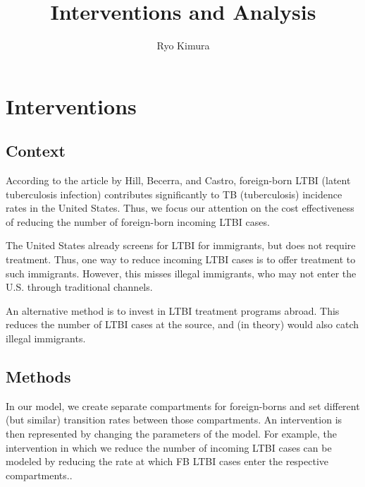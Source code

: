 \documentclass{article}[11pt]
\begin{document}
\title{Interventions and Analysis}
\author{Ryo Kimura}
\date{}
\maketitle

\section{Interventions}
\subsection{Context}
According to the article by Hill, Becerra, and Castro, foreign-born LTBI (latent tuberculosis infection) contributes significantly to TB (tuberculosis) incidence rates in the United States. Thus, we focus our attention on the cost effectiveness of reducing the number of foreign-born incoming LTBI cases.

The United States already screens for LTBI for immigrants, but does not require treatment. Thus, one way to reduce incoming LTBI cases is to offer treatment to such immigrants. However, this misses illegal immigrants, who may not enter the U.S. through traditional channels.

An alternative method is to invest in LTBI treatment programs abroad. This reduces the number of LTBI cases at the source, and (in theory) would also catch illegal immigrants.

\subsection{Methods}
In our model, we create separate compartments for foreign-borns and set different (but similar) transition rates between those compartments. An intervention is then represented by changing the parameters of the model. For example, the intervention in which we reduce the number of incoming LTBI cases can be modeled by reducing the rate at which FB LTBI cases enter the respective compartments..
\end{document}
